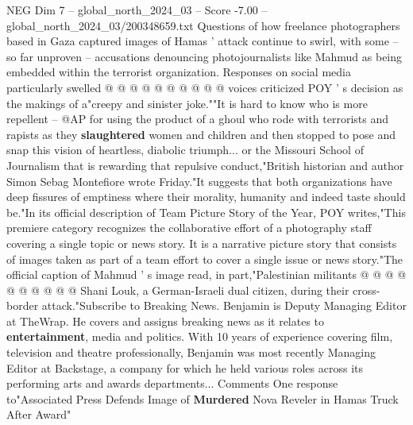 \begin{textsample}{NEG Dim 7 – global\_north\_2024\_03 – Score -7.00 – global\_north\_2024\_03/200348659.txt}
Questions of how freelance photographers based in Gaza captured images of Hamas ' attack continue to swirl, with some -- so far unproven -- accusations denouncing photojournalists like Mahmud as being embedded within the terrorist organization.
Responses on social media particularly swelled @ @ @ @ @ @ @ @ @ @ voices criticized POY ' s decision as the makings of a"creepy and sinister joke.""It is hard to know who is more repellent -- @AP for using the product of a ghoul who rode with terrorists and rapists as they \textbf{slaughtered} women and children and then stopped to pose and snap this vision of heartless, diabolic triumph... or the Missouri School of Journalism that is rewarding that repulsive conduct,"British historian and author Simon Sebag Montefiore wrote Friday."It suggests that both organizations have deep fissures of emptiness where their morality, humanity and indeed taste should be."In its official description of Team Picture Story of the Year, POY writes,"This premiere category recognizes the collaborative effort of a photography staff covering a single topic or news story.
It is a narrative picture story that consists of images taken as part of a team effort to cover a single issue or news story."The official caption of Mahmud ' s image read, in part,"Palestinian militants @ @ @ @ @ @ @ @ @ @ Shani Louk, a German-Israeli dual citizen, during their cross-border attack."Subscribe to Breaking News.
Benjamin is Deputy Managing Editor at TheWrap.
He covers and assigns breaking news as it relates to \textbf{entertainment}, media and politics.
With 10 years of experience covering film, television and theatre professionally, Benjamin was most recently Managing Editor at Backstage, a company for which he held various roles across its performing arts and awards departments...
Comments One response to"Associated Press Defends Image of \textbf{Murdered} Nova Reveler in Hamas Truck After Award"

\end{textsample}
